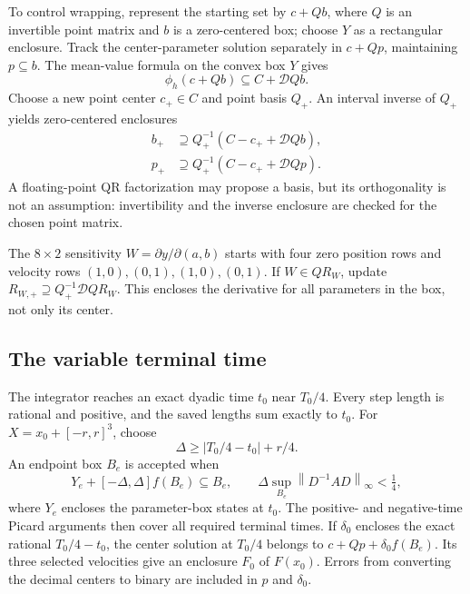 \documentclass[10pt,a4paper]{article}
\theoremstyle{remark}
\newcommand{\norm}[1]{\left\lVert #1\right\rVert_\infty}
\newcommand{\abs}[1]{\left|#1\right|}
\begin{document}
To control wrapping, represent the starting set by $c+Qb$, where $Q$
is an invertible point matrix and $b$ is a zero-centered box; choose $Y$
as a rectangular enclosure. Track the center-parameter solution
separately in $c+Qp$, maintaining $p\subseteq b$. The mean-value
formula on the convex box $Y$ gives
\[
 \phi_h(c+Qb)\subseteq C+\mathcal DQb.
\]
Choose a new point center $c_+\in C$ and point basis $Q_+$. An interval
inverse of $Q_+$ yields zero-centered enclosures
\begin{equation}
 \begin{split}
 b_+&\supseteq Q_+^{-1}(C-c_++\mathcal DQb),\\
 p_+&\supseteq Q_+^{-1}(C-c_++\mathcal DQp).
 \end{split}
 \label{eq:propagation}
\end{equation}
A floating-point QR factorization may propose a basis, but its
orthogonality is not an assumption: invertibility and the inverse
enclosure are checked for the chosen point matrix.

The $8\times2$ sensitivity $W=\partial y/\partial(a,b)$ starts with
four zero position rows and velocity rows $(1,0),(0,1),(1,0),(0,1)$.
If $W\in Q R_W$, update
$R_{W,+}\supseteq Q_+^{-1}\mathcal DQ R_W$. This encloses the
derivative for all parameters in the box, not only its center.

\subsection{The variable terminal time}
The integrator reaches an exact dyadic time $t_0$ near $T_0/4$.
Every step length is rational and positive, and the saved lengths sum
exactly to $t_0$. For $X=x_0+[-r,r]^3$, choose
\begin{equation}
 \Delta\ge\abs{T_0/4-t_0}+r/4.
 \label{eq:Delta}
\end{equation}
An endpoint box $B_e$ is accepted when
\begin{equation}
 Y_e+[-\Delta,\Delta]f(B_e)\subseteq B_e,\qquad
 \Delta\sup_{B_e}\norm{D^{-1}AD}<\tfrac14,
 \label{eq:endpicard}
\end{equation}
where $Y_e$ encloses the parameter-box states at $t_0$. The positive-
and negative-time Picard arguments then cover all required terminal
times. If $\delta_0$ encloses the exact rational $T_0/4-t_0$, the
center solution at $T_0/4$ belongs to
$c+Qp+\delta_0 f(B_e)$. Its three selected velocities give an enclosure
$F_0$ of $F(x_0)$. Errors from converting the decimal centers to binary
are included in $p$ and $\delta_0$.
\end{document}
